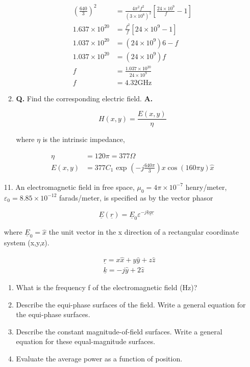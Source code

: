\documentclass[main.tex]{subfiles}
\begin{document}
\begin{enumerate}
\begin{enumerate}
        $$
        \begin{aligned}
        \left(\frac{640}{3}\right)^2 & =\frac{4 \pi^2 f^2}{\left(3 \times 10^8\right)^2}\left[\frac{24 \times 10^9}{f}-1\right] \\
        1.637 \times 10^{20} & =\frac{f^2}{f}\left[24 \times 10^9-1\right] \\
        1.037 \times 10^{20} & =\left(24 \times 10^9\right) 6-f \\
        1.037 \times 10^{20} & =\left(24 \times 10^9\right) f \\
        f & =\frac{1.037 \times 10^{20}}{24 \times 10^9} \\
        f & =4.32 \mathrm{GHz}
        \end{aligned}
        $$
        
        \item \textbf{Q.} Find the corresponding electric field. \textbf{A.}

        $$
        H(x, y)=\frac{E(x, y)}{\eta}
        $$
        
        where $\eta$ is the intrinsic impedance, 
        
        $$
        \begin{aligned}
        \eta &= 120 \pi=377 \Omega \\
        E(x, y) &= 377 C_1 \text { exp }\left(-j \frac{640 \pi}{3}\right) x \cos (160 \pi y) \hat{x}
        \end{aligned}
        $$
        
    \end{enumerate}
    
\item [11.] An electromagnetic field in free space, $\mu_{0}=4 \pi \times 10^{-7}$ henry/meter, $\varepsilon_0 = 8.85 \times 10^{-12}$ farads/meter, is specified as by the vector phasor 

$$\underline{E}(\underline{r})=\underline{E}_{0} \varepsilon^{-j \underline{k} \underline{g} \underline{r}}$$

where $\underline{E}_{0}=\hat{x}$ the unit vector in the x direction of a rectangular coordinate system (x,y,z).

$$\begin{aligned}
&\underline{r}=x \hat{x}+y \hat{y}+z \hat{z} \\
&\underline{k}=-j \hat{y}+2 \hat{z}
\end{aligned}$$

    \begin{enumerate}
        \item What is the frequency f of the electromagnetic field (Hz)?
        \item Describe the equi-phase surfaces of the field. Write a general equation for the equi-phase surfaces.
        \item Describe the constant magnitude-of-field surfaces. Write a general equation for these equal-magnitude surfaces.
        \item Evaluate the average power as a function of position.
    \end{enumerate}


\end{enumerate}
\end{document}
